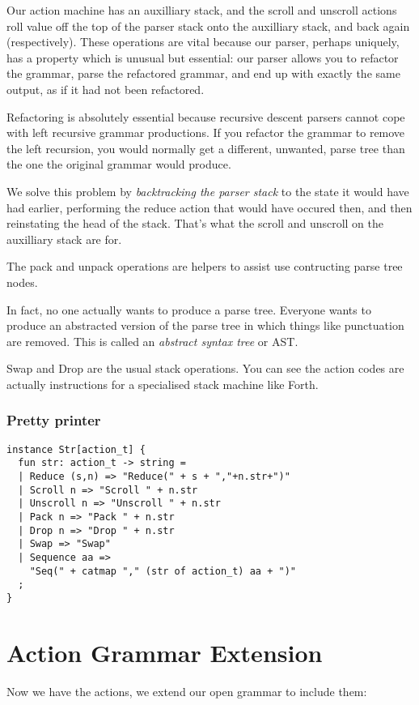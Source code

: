 \documentclass[oneside]{book}
\begin{document}
Our action machine has an auxilliary stack, and the scroll and
unscroll actions roll value off the top of the parser stack
onto the auxilliary stack, and back again (respectively).
These operations are vital because our parser, perhaps uniquely,
has a property which is unusual but essential: our parser allows
you to refactor the grammar, parse the refactored grammar, and
end up with exactly the same output, as if it had not been
refactored.

Refactoring is absolutely essential because recursive descent
parsers cannot cope with left recursive grammar productions.
If you refactor the grammar to remove the left recursion,
you would normally get a different, unwanted, parse tree
than the one the original grammar would produce.

We solve this problem by {\em backtracking the parser stack}
to the state it would have had earlier, performing the 
reduce action that would have occured then, and then
reinstating the head of the stack. That's what the
scroll and unscroll on the auxilliary stack are for.

The pack and unpack operations are helpers to assist use
contructing parse tree nodes. 

In fact, no one actually wants to produce a parse tree.
Everyone wants to produce an abstracted version of the
parse tree in which things like punctuation are removed.
This is called an {\em abstract syntax tree} or AST.

Swap and Drop are the usual stack operations.
You can see the action codes are actually instructions
for a specialised stack machine like Forth.


\subsubsection{Pretty printer}
\begin{verbatim}
instance Str[action_t] {
  fun str: action_t -> string =
  | Reduce (s,n) => "Reduce(" + s + ","+n.str+")"
  | Scroll n => "Scroll " + n.str
  | Unscroll n => "Unscroll " + n.str
  | Pack n => "Pack " + n.str
  | Drop n => "Drop " + n.str
  | Swap => "Swap"
  | Sequence aa =>
    "Seq(" + catmap "," (str of action_t) aa + ")"
  ;
}
\end{verbatim}

\section{Action Grammar Extension}
Now we have the actions, we extend our open grammar to
include them:
\end{document}
